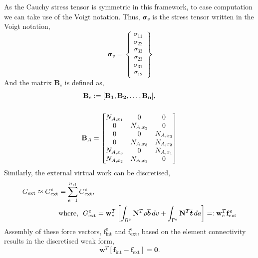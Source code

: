 As the Cauchy stress tensor is symmetric in this framework, to ease computation we can take use of the Voigt notation. 
 Thus, $\boldsymbol{\sigma}_{v}$ is the stress tensor written in the Voigt notation,
\begin{equation}
    \boldsymbol{\sigma}_{v} = \begin{Bmatrix}
        \sigma_{11}\\
        \sigma_{22}\\
        \sigma_{33}\\
        \sigma_{23}\\
        \sigma_{31}\\
        \sigma_{12}
    \end{Bmatrix}
\end{equation}
And the matrix $\mathbf{B}_{e}$ is defined as,
\begin{align}
    \mathbf{B}_{e} &:= [\mathbf{B_{1}}, \mathbf{B_{2}}, \dots, \mathbf{B_{n}}], \notag\\
    \notag \\ 
    \mathbf{B}_{A} &= \begin{bmatrix}
        N_{A,x_{1}} & 0 & 0 \\
        0 & N_{A,x_{2}} & 0 \\
        0 & 0 & N_{A,x_{3}} \\
        0 & N_{A,x_{3}} & N_{A,x_{2}} \\
        N_{A,x_{3}} & 0 & N_{A,x_{1}} \\
        N_{A,x_{2}} & N_{A,x_{1}} & 0 \\
    \end{bmatrix}
\end{align}
%
Similarly, the external virtual work can be discretised,
\begin{align} \label{discretised_g_ext}
    G_{\text{ext}} \approx G^{e}_{\text{ext}} &= \sum^{n_{el}}_{e=1} G^{e}_{\text{ext}}, \notag \\
    &\text{where, }\,\, G^{e}_{\text{ext}} = \mathbf{w}^{T}_{e} \left[
    \int_{\Omega^{e}} \mathbf{N}^{T} \rho \overline{\boldsymbol{b}} \,dv + \int_{\Gamma^{e}} \mathbf{N}^{T} \overline{\boldsymbol{t}} \,da \right] =: \mathbf{w}^{T}_{e}\mathbf{f}^{e}_{\text{ext}}
\end{align}
%
Assembly of these force vectors, $\boldsymbol{\mathrm{f}}^{\mathrm{e}}_{\text{int}}$ and $\boldsymbol{\mathrm{f}}^{\mathrm{e}}_{\text{ext}}$, based on the element connectivity results in the discretised weak form,
 \begin{equation} \label{discretised_system_eq}
    \mathbf{w}^{T}[\mathbf{f}_{\text{int}} - \mathbf{f}_{\text{ext}}] = \boldsymbol{0}.
 \end{equation}

